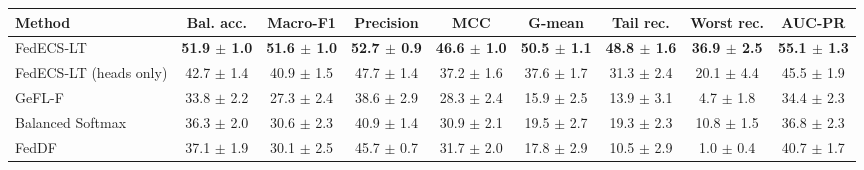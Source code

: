\begin{tabular}{lcccccccc}
\toprule
Method & Bal. acc. & Macro-F1 & Precision & MCC & G-mean & Tail rec. & Worst rec. & AUC-PR\\
\midrule
FedECS-LT & \textbf{51.9 $\pm$ 1.0} & \textbf{51.6 $\pm$ 1.0} & \textbf{52.7 $\pm$ 0.9} & \textbf{46.6 $\pm$ 1.0} & \textbf{50.5 $\pm$ 1.1} & \textbf{48.8 $\pm$ 1.6} & \textbf{36.9 $\pm$ 2.5} & \textbf{55.1 $\pm$ 1.3}\\
FedECS-LT (heads only) & 42.7 $\pm$ 1.4 & 40.9 $\pm$ 1.5 & 47.7 $\pm$ 1.4 & 37.2 $\pm$ 1.6 & 37.6 $\pm$ 1.7 & 31.3 $\pm$ 2.4 & 20.1 $\pm$ 4.4 & 45.5 $\pm$ 1.9\\
GeFL-F & 33.8 $\pm$ 2.2 & 27.3 $\pm$ 2.4 & 38.6 $\pm$ 2.9 & 28.3 $\pm$ 2.4 & 15.9 $\pm$ 2.5 & 13.9 $\pm$ 3.1 & 4.7 $\pm$ 1.8 & 34.4 $\pm$ 2.3\\
Balanced Softmax & 36.3 $\pm$ 2.0 & 30.6 $\pm$ 2.3 & 40.9 $\pm$ 1.4 & 30.9 $\pm$ 2.1 & 19.5 $\pm$ 2.7 & 19.3 $\pm$ 2.3 & 10.8 $\pm$ 1.5 & 36.8 $\pm$ 2.3\\
FedDF & 37.1 $\pm$ 1.9 & 30.1 $\pm$ 2.5 & 45.7 $\pm$ 0.7 & 31.7 $\pm$ 2.0 & 17.8 $\pm$ 2.9 & 10.5 $\pm$ 2.9 & 1.0 $\pm$ 0.4 & 40.7 $\pm$ 1.7\\
\bottomrule
\end{tabular}
